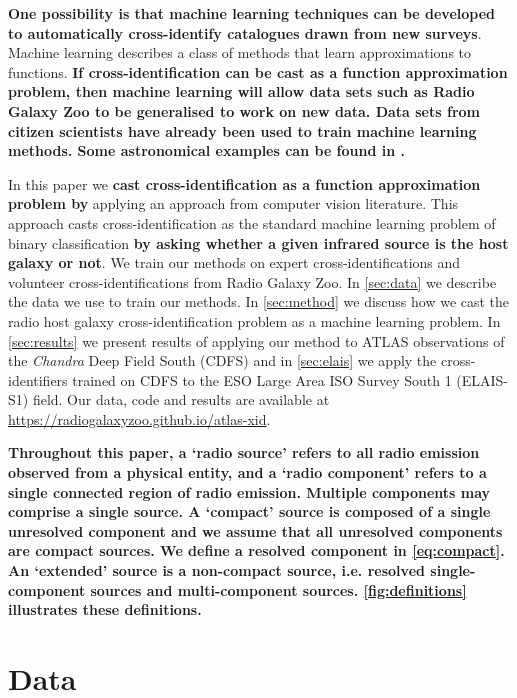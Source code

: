 \documentclass[fleqn,usenatbib,usedcolumn]{mnras}
\newcommand{\edited}[1]{{\bf {#1}}}
\begin{document}
  \edited{One possibility is that machine learning techniques can
  be developed to automatically cross-identify catalogues drawn from new surveys}. Machine learning
  describes a class of methods that learn approximations to functions. \edited{If
  cross-identification can be cast as a function approximation problem, then machine learning will allow data
  sets such as Radio Galaxy Zoo to be generalised to work on new data. Data sets from
  citizen scientists have already been used to train machine learning methods.
  Some astronomical examples can be found in \citet{marshall15citizenscience}.}

  In this paper we \edited{cast cross-identification as a function
  approximation problem by} applying an approach from computer vision
  literature. This approach casts cross-identification as the standard machine
  learning problem of binary classification \edited{by asking whether a given
  infrared source is the host galaxy or not}. We train our methods on expert
  cross-identifications and volunteer cross-identifications from Radio Galaxy Zoo. In
  \autoref{sec:data} we describe the data we use to train our methods. In
  \autoref{sec:method} we discuss how we cast the radio host galaxy
  cross-identification problem as a machine learning problem. In
  \autoref{sec:results} we present results of applying our method to ATLAS
  observations of the \emph{Chandra} Deep Field South (CDFS) and in
  \autoref{sec:elais} we apply the cross-identifiers trained on CDFS to the
  ESO Large Area ISO Survey South 1 (ELAIS-S1) field. Our data, code and results are
  available at \url{https://radiogalaxyzoo.github.io/atlas-xid}.

  \edited{Throughout this paper, a `radio source' refers to all radio emission observed from
  a physical entity, and a `radio component' refers to a single connected
  region of radio emission. Multiple components may comprise a single
  source. A `compact' source is composed of a \edited{single unresolved component} and we
  assume that all unresolved components are compact sources. \edited{We define a resolved component in \autoref{eq:compact}.} An `extended'
  source is a non-compact source, i.e. resolved single-component sources and
  multi-component sources. \autoref{fig:definitions} illustrates these definitions.}

\section{Data}\label{sec:data}
\end{document}
